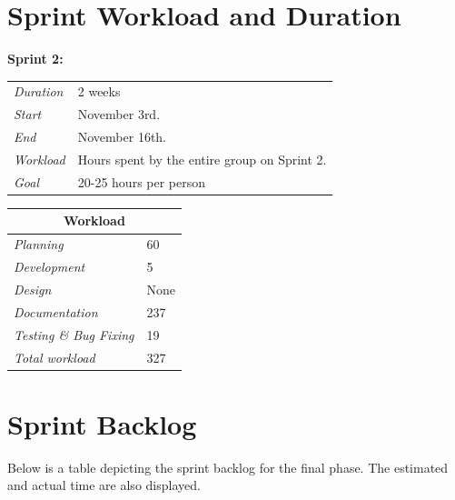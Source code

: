 \section{Sprint Workload and Duration}
\label{sec:FinalWorkload}
%
\begin{minipage}{\linewidth}
\centering
\setlength{\tabcolsep}{22pt}
\textbf{Sprint 2:} 
\smallskip
{}
\begin{tabular}{ |l l| }
	\hline
	\it{Duration} & 2 weeks \\
	\it{Start} & November 3rd. \\
	\it{End} & November 16th. \\
	\it{Workload} & Hours spent by the entire group on Sprint 2. \\
	\it{Goal} & 20-25 hours per person \\
	\hline
\end{tabular}
\end{minipage}
\bigskip
%
\begin{minipage}{\linewidth}
\setlength{\tabcolsep}{25pt}
\centering
{}
\begin{tabular}{ |l|p| }
	\hline
	\multicolumn{2}{|c|}{\cellcolor{gray!25} Workload} \\
	\hline
	\it{Planning} & 60 \\
	\it{Development} & 5 \\
	\it{Design} & None \\
	\it{Documentation} & 237 \\
	\it{Testing \& Bug Fixing} & 19 \\
	\hline
	\it{Total workload} & 327 \\
	\hline
\end{tabular}

\end{minipage}

\section{Sprint Backlog}
\label{sec:FinalBacklog}

Below is a table depicting the sprint backlog for the final phase. The estimated and actual time are also displayed.

